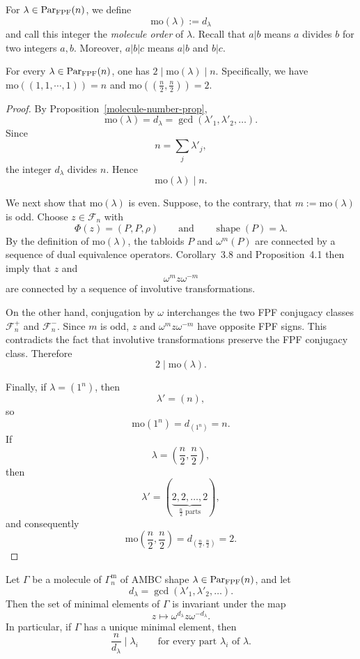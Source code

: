 \documentclass[11pt]{article}
\begin{document}
For $\lambda\in{\operatorname{Par}_{\mathrm{FPF}}}(n)$, we define
\[
\mathrm{mo}(\lambda):=d_\lambda
\]
and call this integer the \emph{molecule order} of $\lambda$.  Recall that $a|b$ means $a$ divides $b$ for two integers $a,b$. Moreover, $a|b|c$ means $a|b$ and $b|c$.



\begin{proposition}
For every
$\lambda\in{\operatorname{Par}_{\mathrm{FPF}}}(n)$, one has $2\mid\mathrm{mo}(\lambda)\mid n$. Specifically, we have $\mathrm{mo}((1,1,\cdots,1))=n$ and $\mathrm{mo}((\frac{n}{2},\frac{n}{2}))=2$.
\end{proposition}
\begin{proof}
By Proposition~\ref{molecule-number-prop},
\[
\mathrm{mo}(\lambda)
=
d_\lambda
=
\gcd(\lambda'_1,\lambda'_2,\ldots).
\]
Since
\[
n=\sum_j\lambda'_j,
\]
the integer $d_\lambda$ divides $n$. Hence
\[
\mathrm{mo}(\lambda)\mid n.
\]

We next show that $\mathrm{mo}(\lambda)$ is even.
Suppose, to the contrary, that
$m:=\mathrm{mo}(\lambda)$ is odd. Choose
$z\in\mathcal F_n$ with
\[
\Phi(z)=(P,P,\rho)
\qquad\text{and}\qquad
\operatorname{shape}(P)=\lambda.
\]
By the definition of $\mathrm{mo}(\lambda)$, the tabloids
$P$ and $\omega^m(P)$ are connected by a sequence of dual
equivalence operators. Corollary~3.8 and Proposition~4.1 then
imply that $z$ and
\[
\omega^m z\omega^{-m}
\]
are connected by a sequence of involutive transformations.

On the other hand, conjugation by $\omega$ interchanges the two
FPF conjugacy classes $\mathcal F_n^+$ and $\mathcal F_n^-$.
Since $m$ is odd, $z$ and $\omega^m z\omega^{-m}$ have opposite
FPF signs. This contradicts the fact that involutive
transformations preserve the FPF conjugacy class. Therefore
\[
2\mid\mathrm{mo}(\lambda).
\]

Finally, if $\lambda=(1^n)$, then
\[
\lambda'=(n),
\]
so
\[
\mathrm{mo}(1^n)=d_{(1^n)}=n.
\]
If
\[
\lambda=\left(\frac n2,\frac n2\right),
\]
then
\[
\lambda'
=
(\underbrace{2,2,\ldots,2}_{\frac n2\text{ parts}}),
\]
and consequently
\[
\mathrm{mo}
\left(\frac n2,\frac n2\right)
=
d_{(\frac n2,\frac n2)}
=
2.
\]
\end{proof}

\begin{proposition}
\label{minimal-orbit-prop}
Let $\Gamma$ be a molecule of $\Gamma_n^{\mathrm m}$ of
AMBC shape $\lambda\in{\operatorname{Par}_{\mathrm{FPF}}}(n)$,
and let
\[
d_\lambda=\gcd(\lambda'_1,\lambda'_2,\ldots).
\]
Then the set of minimal elements of $\Gamma$ is invariant under
the map
\[
z\longmapsto \omega^{d_\lambda}z\omega^{-d_\lambda}.
\]
In particular, if $\Gamma$ has a unique minimal element, then
\[
\frac{n}{d_\lambda}\mid\lambda_i
\qquad\text{for every part $\lambda_i$ of $\lambda$.}
\]
\end{proposition}
\end{document}
